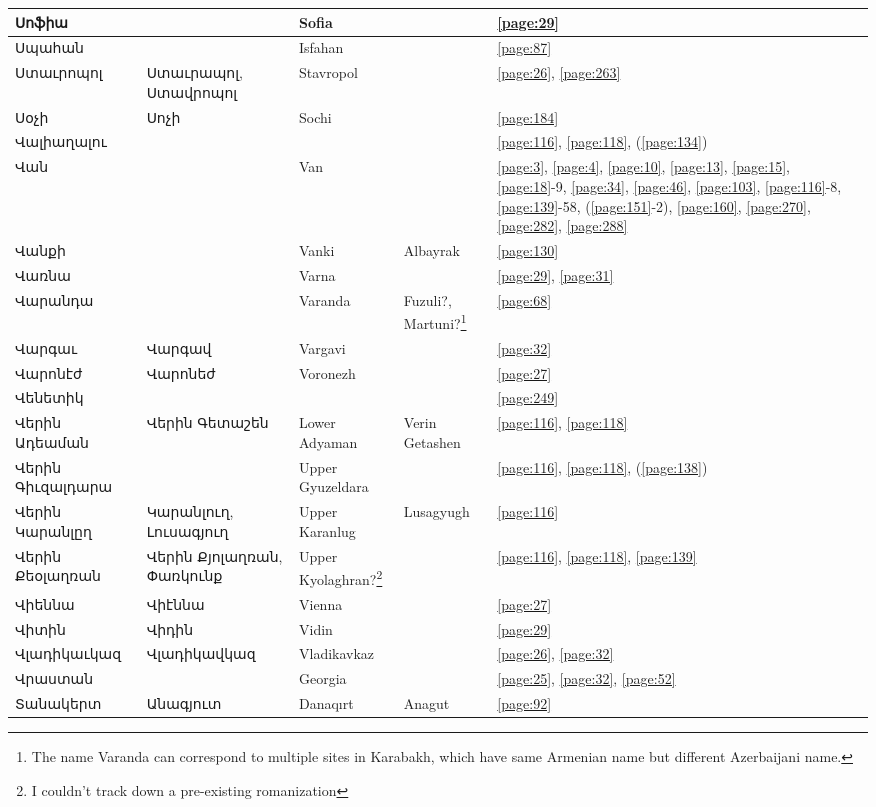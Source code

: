 \begin{center}
\begin{longtable}{|p{}|p{3cm}|p{3cm}|p{2cm}|p{3cm}|}
Սոֆիա& &Sofia & &\ref{page:29}\\ \hline
Սպահան& &Isfahan & &\ref{page:87}\\ \hline
Ստաւրոպոլ& Ստաւրապոլ, Ստավրոպոլ& Stavropol& &\ref{page:26}, \ref{page:263}\\ \hline
Սօչի& Սոչի& Sochi& &\ref{page:184}\\ \hline
Վալիաղալու& & & &\ref{page:116}, \ref{page:118}, (\ref{page:134})\\ \hline
Վան& &Van & &\ref{page:3}, \ref{page:4}, \ref{page:10}, \ref{page:13}, \ref{page:15}, \ref{page:18}-9, \ref{page:34}, \ref{page:46}, \ref{page:103}, \ref{page:116}-8, \ref{page:139}-58, (\ref{page:151}-2), \ref{page:160}, \ref{page:270}, \ref{page:282}, \ref{page:288}\\ \hline
	Վանքի& & Vanki&Albayrak &\ref{page:130}\\ \hline
	Վառնա& &Varna & &\ref{page:29}, \ref{page:31}\\ \hline
	Վարանդա& &Varanda & Fuzuli?, Martuni?\footnote{The name Varanda can correspond to multiple sites in Karabakh, which have same Armenian name but different Azerbaijani name. }&\ref{page:68}\\ \hline
	Վարգաւ& Վարգավ& Vargavi  & &\ref{page:32}\\ \hline
	Վարոնէժ&Վարոնեժ & Voronezh& &\ref{page:27}\\ \hline
	Վենետիկ& & & &\ref{page:249}\\ \hline
	Վերին Ադեաման& Վերին Գետաշեն& Lower Adyaman&  Verin Getashen&\ref{page:116}, \ref{page:118}\\ \hline
	Վերին Գիւզալդարա& &Upper Gyuzeldara   & &\ref{page:116}, \ref{page:118}, (\ref{page:138})\\ \hline
	Վերին Կարանլըղ&Կարանլուղ, Լուսագյուղ   & Upper Karanlug &  Lusagyugh &\ref{page:116}\\ \hline
	Վերին Քեօլաղռան&Վերին Քյոլաղռան, Փառկունք & Upper Kyolaghran?\footnote{I couldn't track down a pre-existing romanization}& &\ref{page:116}, \ref{page:118}, \ref{page:139}\\ \hline
	Վիեննա&Վիէննա &Vienna & &\ref{page:27}\\ \hline
	Վիտին&Վիդին &Vidin & &\ref{page:29}\\ \hline
	Վլադիկաւկազ&Վլադիկավկազ &Vladikavkaz & &\ref{page:26}, \ref{page:32}\\ \hline
	Վրաստան& & Georgia& &\ref{page:25}, \ref{page:32}, \ref{page:52}\\ \hline
	Տանակերտ&Անագյուտ & Danaqırt    & Anagut&\ref{page:92}\\ \hline

\end{longtable}
\end{center}
